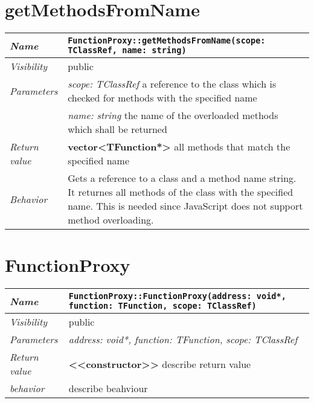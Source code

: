 \section{getMethodsFromName}
\begin{longtable}{p{3cm} @{\hskip 1cm} p{12cm}}
	\hline

	\textit{Name} & \texttt{FunctionProxy::getMethodsFromName(scope: TClassRef, name: string)}\\
	\hline

	\textit{Visibility} & public\\
	\hline

	\textit{Parameters} & \textit{scope: TClassRef} a reference to the class which is checked for methods with the specified name\\
		& \textit{name: string} the name of the overloaded methods which shall be returned\\
	\hline

	\textit{Return value} & \textbf{vector<TFunction*>} all methods that match the specified name\\
	\hline

	\textit{Behavior} & Gets a reference to a class and a method name string. It returnes all methods of the class with the specified name. This is needed since JavaScript does not support method overloading.\\
	\hline

\end{longtable} \pagebreak

\section{FunctionProxy}
\begin{longtable}{p{3cm} @{\hskip 1cm} p{12cm}}
	\hline

	\textit{Name} & \texttt{FunctionProxy::FunctionProxy(address: void*, function: TFunction, scope: TClassRef)}\\
	\hline

	\textit{Visibility} & public\\
	\hline

	\textit{Parameters} & \textit{address: void*, function: TFunction, scope: TClassRef}\\
	\hline

	\textit{Return value} & \textbf{ <<constructor>>} describe return value\\
	\hline

	\textit{behavior} & describe beahviour \\
	\hline

\end{longtable} \pagebreak

